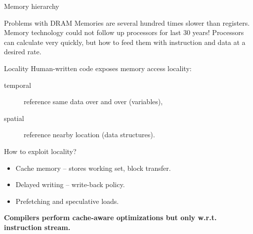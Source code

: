 \documentclass[8pt]{beamer}
\begin{document}
\begin{frame}{Memory hierarchy}
  \begin{alertblock}{Problems with DRAM}
    Memories are several hundred times slower than registers. Memory technology
    could not follow up processors for last 30 years! Processors can calculate
    very quickly, but how to feed them with instruction and data at a desired
    rate.
  \end{alertblock}

  \begin{block}{Locality}
    Human-written code exposes memory access locality:
    \begin{description}
      \item[temporal] reference same data over and over (variables),
      \item[spatial] reference nearby location (data structures).
    \end{description}
    \vspace{1em}
    How to exploit locality?
    \begin{itemize}
      \item Cache memory -- stores working set, block transfer.
      \item Delayed writing -- write-back policy.
      \item Prefetching and speculative loads.
    \end{itemize}
    \vspace{1em}
    \textbf{Compilers perform cache-aware optimizations but only w.r.t.
      instruction stream.}
  \end{block}
\end{frame}
\end{document}
